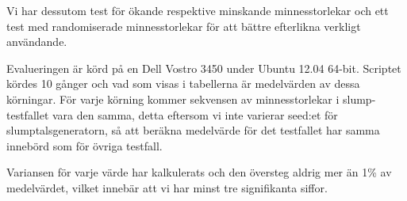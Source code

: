 \documentclass[a4paper]{article}
\begin{document}
Vi har dessutom test för ökande respektive minskande minnesstorlekar och ett test med randomiserade minnesstorlekar för att bättre efterlikna verkligt användande.

Evalueringen är körd på en Dell Vostro 3450 under Ubuntu 12.04 64-bit.
Scriptet kördes 10 gånger och vad som visas i tabellerna är medelvärden av dessa körningar.
För varje körning kommer sekvensen av minnesstorlekar i slump-testfallet vara den samma, detta eftersom vi inte varierar seed:et för slumptalsgeneratorn, så att beräkna medelvärde för det testfallet har samma innebörd som för övriga testfall.

Variansen för varje värde har kalkulerats och den översteg aldrig mer än 1\% av medelvärdet, vilket innebär att vi har minst tre signifikanta siffor.

\begin{table}[h]
\centering
\caption{Tidsåtgång för de olika implementationerna}
\end{table}

\begin{table}[h]
\centering
\caption{Minnesåtgång för de olika implementationerna}
\end{table}
\end{document}
